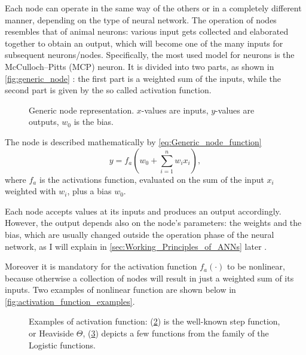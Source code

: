 Each node can operate in the same way of the others or in a completely different manner, depending on the type of neural network.
The operation of nodes resembles that of animal neurons: various input gets collected and elaborated together to obtain an output, which will become one of the many inputs for subsequent neurons/nodes.
Specifically, the most used model for neurons is the McCulloch–Pitts (MCP) neuron.
It is divided into two parts, as shown in \autoref{fig:generic_node} : the first part is a weighted sum of the inputs, while the second part is given by the so called activation function.

\begin{figure}[ht]
	\centering
	
	\caption{Generic node representation. $x$-values are inputs, $y$-values are outputs, $w_0$ is the bias.}
	\label{fig:generic_node}
\end{figure}
The node is described mathematically by \autoref{eq:Generic_node_function}
\begin{equation}
y = f_a \left(  w_0 + \sum_{i=1}^{n} w_i x_i \right),
\label{eq:Generic_node_function}
\end{equation}
where $f_a$ is the activations function, evaluated on the sum of the input $x_i$ weighted with $w_i$, plus a bias $w_0$.

Each node accepts values at its inputs and produces an output accordingly.
However, the output depends also on the node's parameters: the weights and the bias, which are usually changed outside the operation phase of the neural network, as I will explain in \autoref{sec:Working_Principles_of_ANNs} later .

Moreover it is mandatory for the activation function $f_a\left(\cdot\right)$ to be nonlinear, because otherwise a collection of nodes will result in just a weighted sum of its inputs.
Two examples of nonlinear function are shown below in \autoref{fig:activation_function_examples}.

\begin{figure}[ht]
	\begin{subfigure}[b]{0.49\textwidth}
		\centering
		
		\caption{}
		\label{fig:activation_function_example_1}
  \end{subfigure}
  \begin{subfigure}[b]{0.49\textwidth}
  		\centering
		
		\caption{}
		\label{fig:activation_function_example_2}
  \end{subfigure}
  \caption{Examples of activation function: (\ref{fig:activation_function_example_1}) is the well-known step function, or Heaviside $\Theta$, (\ref{fig:activation_function_example_2}) depicts a few functions from the family of the Logistic functions.}
  	\label{fig:activation_function_examples}
\end{figure}

